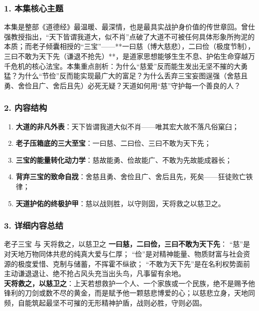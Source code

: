 \subsubsection{1. 本集核心主题}
本集是整部《道德经》最温暖、最深情，也是最具实战护身价值的传世章回。曾仕强教授指出，“天下皆谓我道大，似不肖”点破了大道不可被任何具体形象所拘泥的本质；而老子倾囊相授的“三宝”——**一曰慈（博大慈悲），二曰俭（极度节制），三曰不敢为天下先（谦退不抢先）**，是道家思想能够生生不息、护佑生命穿越万千危机的核心法宝。本集重点剖析：为什么“慈爱”反而能生发出无坚不摧的大勇猛？为什么“节俭”反而能实现最广大的富足？为什么丢弃三宝妄图逞强（舍慈且勇、舍俭且广、舍后且先）必死无疑？天道如何用“慈”守护每一个善良的人？

\subsubsection{2. 内容结构}
\begin{enumerate}
    \item \textbf{大道的非凡外表}：天下皆谓我道大似不肖——唯其宏大故不落凡俗窠臼；
    \item \textbf{老子压箱底的三大至宝}：一曰慈、二曰俭、三曰不敢为天下先；
    \item \textbf{三宝的能量转化动力学}：慈故能勇、俭故能广、不敢为先故能成器长；
    \item \textbf{背弃三宝的致命自戕}：舍慈且勇、舍俭且广、舍后且先，死矣——狂徒败亡铁律；
    \item \textbf{天道护佑的终极护甲}：慈以战则胜，以守则固，天将救之以慈卫之。
\end{enumerate}

\subsubsection{3. 详细内容总结}

\begin{ConceptBox}{老子三宝 与 天将救之，以慈卫之}
\textbf{一曰慈，二曰俭，三曰不敢为天下先}：
“慈”是对天地万物同体共悲的纯真大爱与仁厚；
“俭”是对精神能量、物质财富与社会资源的极度爱惜、克制与储蓄，不挥霍不纵欲；
“不敢为天下先”是在名利权势面前主动谦退退让、绝不抢占风头充当出头鸟，凡事留有余地。\\
\textbf{天将救之，以慈卫之}：上天若想救护一个人、一个家族或一个民族，绝不是赐予他锋利的刀剑或数不尽的黄金，而是赋予他一颗慈悲博爱的心；以慈悲立身，天地同频，自能筑起最坚不可摧的无形精神护盾，战则必胜，守则必固。
\end{ConceptBox}

